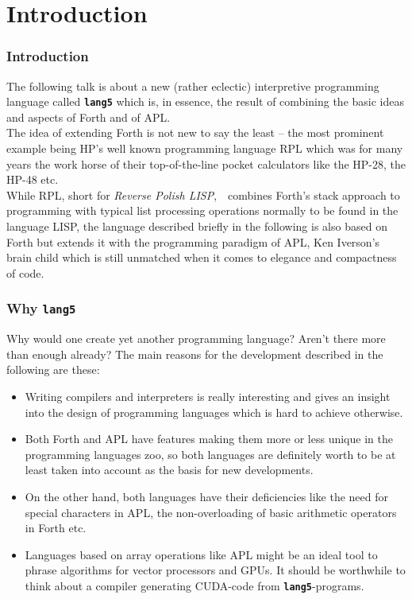 \documentclass{beamer}
\title{\F}
\author{Dr. Bernd Ulmann}
\date{26-SEP-2020}
\newcommand*{\NIX}{\vspace*{.3cm}\\}
\newcommand*{\F}{{\tt\bf lang5}}
\begin{document}
 \begin{frame}[containsverbatim]
  \titlepage
 \end{frame}
%
 \section{Introduction}
  \begin{frame}
   \frametitle{Introduction}
   The following talk is about a new (rather eclectic) interpretive programming
   language called \F{ } which is, in essence, the result of combining the
   basic ideas and aspects of Forth and of APL.
   \NIX
   The idea of extending Forth is not new to say the least -- the most 
   prominent example being HP's well known programming language RPL which
   was for many years the work horse of their top-of-the-line pocket
   calculators like the HP-28, the HP-48 etc.
   \NIX
   While RPL, short for \emph{Reverse Polish LISP},{~} combines Forth's stack
   approach to programming with typical list processing operations normally
   to be found in the language LISP, the language described briefly in the
   following is also based on Forth but extends it with the programming
   paradigm of APL, Ken Iverson's brain child which is still unmatched when
   it comes to elegance and compactness of code.
  \end{frame}
%
  \begin{frame}
   \frametitle{Why \F}
   Why would one create yet another programming language? Aren't there
   more than enough already? The main reasons for the development described
   in the following are these:
   \begin{itemize}
    \item Writing compilers and interpreters is really interesting and gives
     an insight into the design of programming languages which is hard to
     achieve otherwise.
    \item Both Forth and APL have features making them more or less unique
     in the programming languages zoo, so both languages are definitely 
     worth to be at least taken into account as the basis for new developments.
    \item On the other hand, both languages have their deficiencies like 
     the need for special characters in APL, the non-overloading of basic
     arithmetic operators in Forth etc.
    \item Languages based on array operations like APL might be an ideal tool
     to phrase algorithms for vector processors and GPUs. It should be
     worthwhile to think about a compiler generating CUDA-code from \F-programs.
   \end{itemize}
  \end{frame}
%
\end{document}
